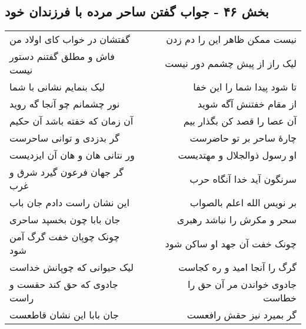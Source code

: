 \begin{center}
\section*{بخش ۴۶ - جواب گفتن ساحر مرده با فرزندان خود}
\label{sec:sh046}
\begin{longtable}{l p{0.5cm} r}
گفتشان در خواب کای اولاد من
&&
نیست ممکن ظاهر این را دم زدن
\\
فاش و مطلق گفتنم دستور نیست
&&
لیک راز از پیش چشمم دور نیست
\\
لیک بنمایم نشانی با شما
&&
تا شود پیدا شما را این خفا
\\
نور چشمانم چو آنجا گه روید
&&
از مقام خفتنش آگه شوید
\\
آن زمان که خفته باشد آن حکیم
&&
آن عصا را قصد کن بگذار بیم
\\
گر بدزدی و توانی ساحرست
&&
چارهٔ ساحر بر تو حاضرست
\\
ور نتانی هان و هان آن ایزدیست
&&
او رسول ذوالجلال و مهتدیست
\\
گر جهان فرعون گیرد شرق و غرب
&&
سرنگون آید خدا آنگاه حرب
\\
این نشان راست دادم جان باب
&&
بر نویس الله اعلم بالصواب
\\
جان بابا چون بخسپد ساحری
&&
سحر و مکرش را نباشد رهبری
\\
چونک چوپان خفت گرگ آمن شود
&&
چونک خفت آن جهد او ساکن شود
\\
لیک حیوانی که چوپانش خداست
&&
گرگ را آنجا امید و ره کجاست
\\
جادوی که حق کند حقست و راست
&&
جادوی خواندن مر آن حق را خطاست
\\
جان بابا این نشان قاطعست
&&
گر بمیرد نیز حقش رافعست
\\
\end{longtable}
\end{center}
